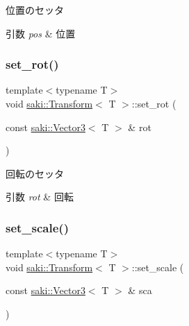 位置のセッタ 


\begin{DoxyParams}{引数}
{\em pos} & 位置 \\
\hline
\end{DoxyParams}
\mbox{\label{classsaki_1_1_transform_a41ee7b20939707750c5a5e4b05985621}} 
\subsubsection{\texorpdfstring{set\+\_\+rot()}{set\_rot()}}
{\footnotesize\ttfamily template$<$typename T$>$ \\
void \mbox{\hyperlink{classsaki_1_1_transform}{saki\+::\+Transform}}$<$ T $>$\+::set\+\_\+rot (\begin{DoxyParamCaption}\item[{const \mbox{\hyperlink{classsaki_1_1_vector3}{saki\+::\+Vector3}}$<$ T $>$ \&}]{rot }\end{DoxyParamCaption})\hspace{0.3cm}{\ttfamily [inline]}}



回転のセッタ 


\begin{DoxyParams}{引数}
{\em rot} & 回転 \\
\hline
\end{DoxyParams}
\mbox{\label{classsaki_1_1_transform_a2dcad3e8995b8e0d03f5164cb450bac5}} 
\subsubsection{\texorpdfstring{set\+\_\+scale()}{set\_scale()}}
{\footnotesize\ttfamily template$<$typename T$>$ \\
void \mbox{\hyperlink{classsaki_1_1_transform}{saki\+::\+Transform}}$<$ T $>$\+::set\+\_\+scale (\begin{DoxyParamCaption}\item[{const \mbox{\hyperlink{classsaki_1_1_vector3}{saki\+::\+Vector3}}$<$ T $>$ \&}]{sca }\end{DoxyParamCaption})\hspace{0.3cm}{\ttfamily [inline]}}



